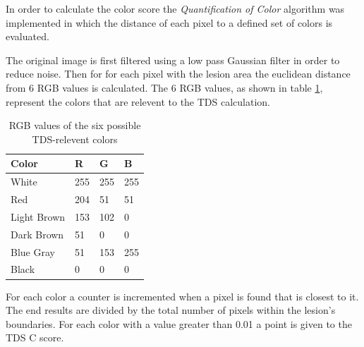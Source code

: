 In order to calculate the color score the \textit{Quantification of Color}\cite{Fernandez_Alcon_2009} algorithm was implemented in which the distance of each pixel to a defined set of colors is evaluated.

The original image is first filtered using a low pass Gaussian filter in order to reduce noise. Then for for each pixel with the lesion area the euclidean distance from 6 RGB values is calculated. The 6 RGB values, as shown in table \ref{fig:tds_color}, represent the colors that are relevent to the TDS calculation.

\begin{table}[H]
\centering
\small
    \begin{tabular}{ | l | l | l | l |}
    \hline
    Color & R & G & B \\ \hline
    White & 255 & 255 & 255 \\
    Red & 204 & 51 & 51 \\
    Light Brown & 153 & 102 & 0 \\
    Dark Brown & 51 & 0 & 0 \\
    Blue Gray & 51 & 153 & 255 \\
    Black & 0 & 0 & 0 \\ \hline

    \end{tabular}

    \caption{RGB values of the six possible TDS-relevent colors\cite{Fernandez_Alcon_2009}}
    \label{fig:tds_color}

\end{table}

For each color a counter is incremented when a pixel is found that is closest to it. The end results are divided by the total number of pixels within the lesion's boundaries. For each color with a value greater than 0.01 a point is given to the TDS C score.

